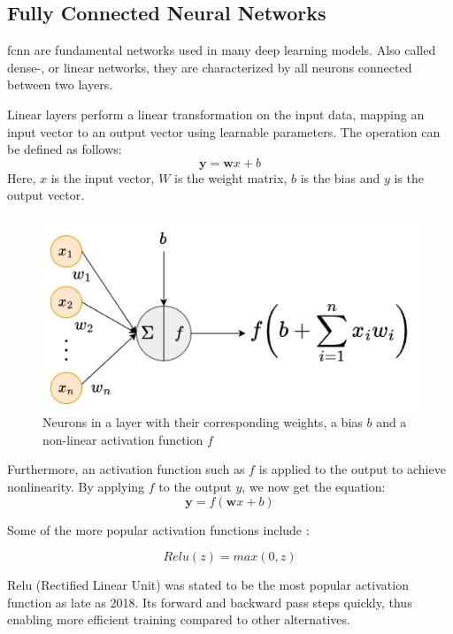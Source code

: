 \subsection{Fully Connected Neural Networks}
\label{back:linear}

\acrfull{fcnn} are fundamental networks used in many deep learning models. Also called dense-, or linear networks, they are characterized by all neurons connected between two layers. 


Linear layers perform a linear transformation on the input data, mapping an input vector to an output vector using learnable parameters. The operation can be defined as follows:
\begin{equation}\label{f:wxb}
    \mathbf{y} = \mathbf{w}x+b
\end{equation}
Here, $x$ is the input vector, $W$ is the weight matrix, $b$ is the bias and $y$ is the output vector.

\begin{figure}[!h]
    \centering
    \includegraphics[width=0.7\linewidth]{figures/dl.png}
    \caption{Neurons in a layer with their corresponding weights, a bias $b$ and a non-linear activation function $f$}
    \label{fig:dl}
\end{figure}

Furthermore, an activation function such as $f$ is applied to the output to achieve nonlinearity. By applying $f$ to the output $y$, we now get the equation:
\begin{equation}\label{f:fwxb}
    \mathbf{y} = f(\mathbf{w}x+b)
\end{equation}

Some of the more popular activation functions include \cite{szandala2021review}: 

\begin{equation}
    Relu(z) = max(0, z)
\end{equation}

Relu (Rectified Linear Unit) was stated to be the most popular activation function as late as 2018. Its forward and backward pass steps quickly, thus enabling more efficient training compared to other alternatives.

